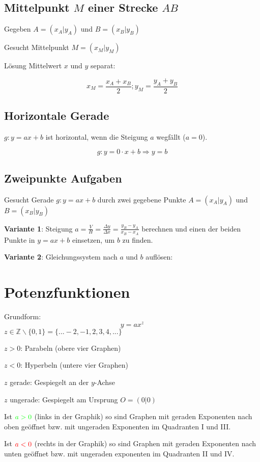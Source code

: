 \begin{multicols}{2}
\subsection*{Mittelpunkt $M$ einer Strecke $AB$}
Gegeben $A=(x_A|y_A)$ und $B=(x_B|y_B)$

Gesucht Mittelpunkt $M=(x_M|y_M)$

Lösung Mittelwert $x$ und $y$ separat:

$$x_M = \frac{x_A+x_B}2; y_M=\frac{y_A+y_B}2$$

\subsection*{Horizontale Gerade}

$g: y=ax+b$ ist horizontal, wenn die Steigung $a$ wegfällt ($a=0$).

$$g:  y=0\cdot{}x+b \Rightarrow y=b$$

\subsection*{Zweipunkte Aufgaben}
Gesucht Gerade $g: y=ax+b$ durch zwei gegebene Punkte $A=(x_A|y_A)$
und $B=(x_B|y_B)$

\textbf{Variante 1}: Steigung $a = \frac{V}H = \frac{\Delta y}{\Delta x}
= \frac{y_B-y_A}{x_B-x_A}$ berechnen und einen der beiden Punkte in
$y=ax+b$ einsetzen, um $b$ zu finden.

\textbf{Variante 2}: Gleichungssystem nach $a$ und $b$ auf\/lösen:

\hrulefill

\section*{Potenzfunktionen}
Grundform:
$$y=ax^z$$
$z\in\mathbb{Z}\backslash\{0,1\} = \{...-2, -1, 2, 3, 4, ...\}$

$z>0$: Parabeln (obere vier Graphen)

$z<0$: Hyperbeln (untere vier Graphen)

$z$ gerade: Gespiegelt an der $y$-Achse

$z$ ungerade: Gespiegelt am Ursprung $O=(0|0)$

Ist ${\color{green}a>0}$ (links in der Graphik) so sind Graphen mit
geraden Exponenten nach oben geöffnet bzw. mit ungeraden Exponenten im
Quadranten I und III.

Ist ${\color{red}a<0}$ (rechts in der Graphik) so sind Graphen mit
geraden Exponenten nach unten geöffnet bzw. mit ungeraden exponenten
im Quadranten II und IV.


\end{multicols}
